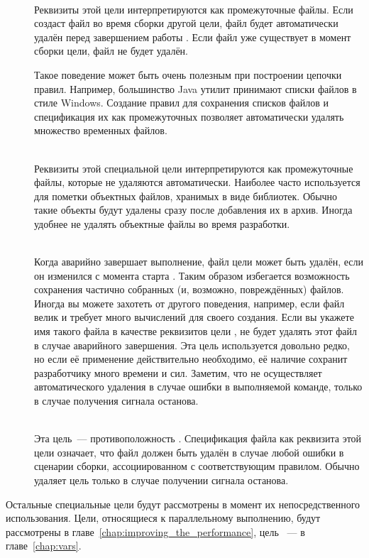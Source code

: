 \begin{description}
\item[] \hfill\\
Реквизиты этой цели интерпретируются как промежуточные файлы. Если
\GNUmake{} создаст файл во время сборки другой цели, файл будет
автоматически удалён перед завершением работы \GNUmake{}. Если файл
уже существует в момент сборки цели, файл не будет удалён.

Такое поведение может быть очень полезным при построении цепочки
правил. Например, большинство Java утилит принимают списки файлов в
стиле Windows. Создание правил для сохранения списков
файлов и спецификация их как промежуточных позволяет \GNUmake{}
автоматически удалять множество временных файлов.

\item[] \hfill\\
Реквизиты этой специальной цели интерпретируются как промежуточные
файлы, которые не удаляются автоматически. Наиболее часто
 используется для пометки объектных файлов,
хранимых в виде библиотек. Обычно такие объекты будут удалены сразу
после добавления их в архив. Иногда удобнее не удалять объектные
файлы во время разработки.

\item[] \hfill\\
Когда \GNUmake{} аварийно завершает выполнение, файл цели может быть
удалён, если он изменился с момента старта \GNUmake{}. Таким образом
избегается возможность сохранения частично собранных (и, возможно,
повреждённых) файлов. Иногда вы можете захотеть от \GNUmake{} другого
поведения, например, если файл велик и требует много вычислений для
своего создания. Если вы укажете имя такого файла в качестве
реквизитов цели , \GNUmake{} не будет удалять этот
файл в случае аварийного завершения. Эта цель используется довольно
редко, но если её применение действительно необходимо, её наличие
сохранит разработчику много времени и сил. Заметим, что \GNUmake{} не
осуществляет автоматического удаления в случае ошибки в выполняемой
команде, только в случае получения сигнала останова.


\item[] \hfill\\
Эта цель~--- противоположность . Спецификация файла
как реквизита этой цели означает, что файл должен быть удалён в случае
любой ошибки в сценарии сборки, ассоциированном с соответствующим
правилом. Обычно \GNUmake{} удаляет цель только в случае получении
сигнала останова.
\end{description}

Остальные специальные цели будут рассмотрены в момент их
непосредственного использования. Цели, относящиеся к параллельному
выполнению, будут рассмотрены в
главе~\ref{chap:improving_the_performance}, цель
~--- в главе~\ref{chap:vars}.
